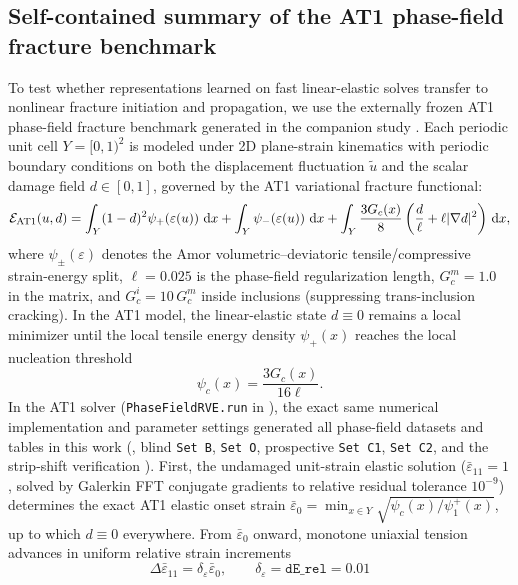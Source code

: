 \documentclass[preprint,11pt,a4paper]{elsarticle}
\newcommand{\dd}{\,\mathrm d}
\begin{document}
\subsection{Self-contained summary of the AT1 phase-field fracture benchmark}
\label{sec:pf}

To test whether representations learned on fast linear-elastic solves transfer to nonlinear fracture initiation and propagation, we use the externally frozen AT1 phase-field fracture benchmark generated in the companion study \cite{GomezOvalle2026}. Each periodic unit cell $Y=[0,1)^2$ is modeled under 2D plane-strain kinematics with periodic boundary conditions on both the displacement fluctuation $\tilde u$ and the scalar damage field $d\in[0,1]$, governed by the AT1 variational fracture functional:
\begin{equation}
\mathcal E_{\rm AT1}(u,d)
= \int_Y (1-d)^2\psi_+(\varepsilon(u))\,\dd x
+ \int_Y \psi_-(\varepsilon(u))\,\dd x
+ \int_Y \frac{3G_c(x)}{8}\left(\frac{d}{\ell} + \ell|\nabla d|^2\right)\dd x,
\label{eq:at1_functional}
\end{equation}
where $\psi_\pm(\varepsilon)$ denotes the Amor volumetric--deviatoric tensile/compressive strain-energy split, $\ell=0.025$ is the phase-field regularization length, $G_c^m=1.0$ in the matrix, and $G_c^i=10\,G_c^m$ inside inclusions (suppressing trans-inclusion cracking). In the AT1 model, the linear-elastic state $d\equiv 0$ remains a local minimizer until the local tensile energy density $\psi_+(x)$ reaches the local nucleation threshold
\begin{equation}
\psi_c(x) = \frac{3G_c(x)}{16\ell}.
\label{eq:at1_threshold}
\end{equation}
In the AT1 solver (\texttt{PhaseFieldRVE.run} in ), the exact same numerical implementation and parameter settings generated all phase-field datasets and tables in this work (, blind \texttt{Set B}, \texttt{Set O}, prospective \texttt{Set C1}, \texttt{Set C2}, and the strip-shift verification ). First, the undamaged unit-strain elastic solution ($\bar\varepsilon_{11}=1$, solved by Galerkin FFT conjugate gradients to relative residual tolerance $10^{-9}$) determines the exact AT1 elastic onset strain $\bar\varepsilon_0 = \min_{x\in Y}\sqrt{\psi_c(x)/\psi_1^+(x)}$, up to which $d\equiv 0$ everywhere. From $\bar\varepsilon_0$ onward, monotone uniaxial tension advances in uniform relative strain increments
\begin{equation}
\Delta\bar\varepsilon_{11} = \delta_\varepsilon\bar\varepsilon_0,
\qquad
\delta_\varepsilon = \texttt{dE\_rel} = 0.01
\label{eq:at1_stepping}
\end{equation}
\end{document}
